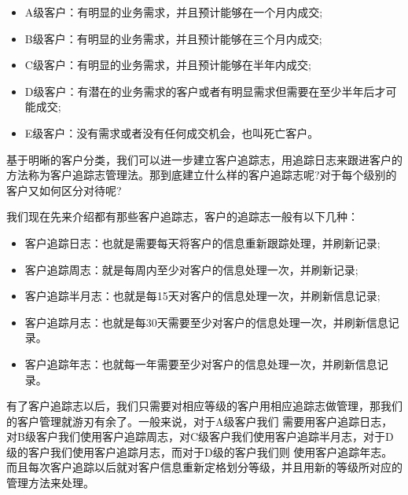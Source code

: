     \begin{itemize}
        \item  A级客户：有明显的业务需求，并且预计能够在一个月内成交;
        \item  B级客户：有明显的业务需求，并且预计能够在三个月内成交;
        \item  C级客户：有明显的业务需求，并且预计能够在半年内成交;
        \item  D级客户：有潜在的业务需求的客户或者有明显需求但需要在至少半年后才可能成交;
        \item  E级客户：没有需求或者没有任何成交机会，也叫死亡客户。
    \end{itemize}

    基于明晰的客户分类，我们可以进一步建立客户追踪志，用追踪日志来跟进客户的方法称为客户追踪志管理法。那到底建立什么样的客户追踪志呢?对于每个级别的客户又如何区分对待呢?

    我们现在先来介绍都有那些客户追踪志，客户的追踪志一般有以下几种：

    \begin{itemize}
        \item 客户追踪日志：也就是需要每天将客户的信息重新跟踪处理，并刷新记录;
        \item 客户追踪周志：就是每周内至少对客户的信息处理一次，并刷新记录;
        \item 客户追踪半月志：也就是每15天对客户的信息处理一次，并刷新信息记录;
        \item 客户追踪月志：也就是每30天需要至少对客户的信息处理一次，并刷新信息记录。
        \item 客户追踪年志：也就每一年需要至少对客户的信息处理一次，并刷新信息记录。
    \end{itemize}

    有了客户追踪志以后，我们只需要对相应等级的客户用相应追踪志做管理，那我们的客户管理就游刃有余了。一般来说，对于A级客户我们 需要用客户追踪日志，对B级客户我们使用客户追踪周志，对C级客户我们使用客户追踪半月志，对于D级的客户我们使用客户追踪月志，而对于D级的客户我们则 使用客户追踪年志。而且每次客户追踪以后就对客户信息重新定格划分等级，并且用新的等级所对应的管理方法来处理。
